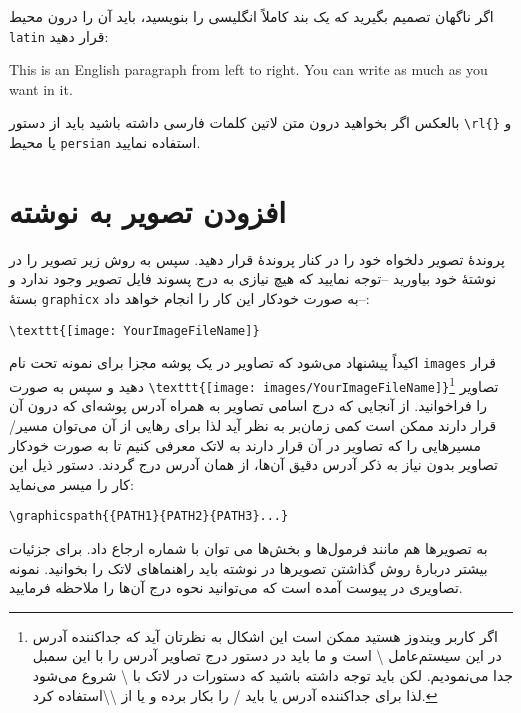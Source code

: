 اگر ناگهان تصمیم بگیرید که یک بند کاملاً انگلیسی را بنویسید، باید آن را درون محیط \Verb+latin+ قرار دهید:‌

\begin{latin}
This is an English paragraph from left to right. You can write as much as you want in it.
\end{latin}

    بالعکس اگر بخواهید درون متن لاتین کلمات فارسی داشته باشید باید از دستور \Verb+\rl{}+ و یا محیط \Verb+persian+ استفاده نمایید. 
    
\section{افزودن تصویر به نوشته}
پروندهٔ تصویر دلخواه خود را در کنار پروندهٔ  قرار دهید. سپس به روش زیر تصویر را در نوشتهٔ خود بیاورید --توجه نمایید که هیچ نیازی به درج پسوند 
فایل تصویر وجود ندارد و بستهٔ \Verb+graphicx+ به صورت خودکار این کار را انجام خواهد داد--:
\begin{Verbatim}
\texttt{[image: YourImageFileName]}
\end{Verbatim}
     اکیداً پیشنهاد می‌شود که تصاویر در یک پوشه مجزا برای نمونه تحت نام \Verb+images+ قرار دهید و سپس به صورت 
    \Verb+\texttt{[image: images/YourImageFileName]}+\footnote{
    اگر کاربر ویندوز هستید ممکن است این اشکال به نظرتان آید که جداکننده آدرس در این سیستم‌عامل \textbackslash{}     است و ما باید در دستور درج تصاویر 
    آدرس را با این سمبل جدا می‌نمودیم. لکن باید توجه داشته باشید که دستورات در لاتک با \textbackslash{}  شروع می‌شود لذا برای جداکننده 
    آدرس یا باید /  را بکار برده و یا از \textbackslash\textbackslash استفاده کرد.}
    تصاویر را فراخوانید. از آنجایی که درج اسامی تصاویر به همراه آدرس پوشه‌ای که درون آن قرار دارند ممکن است کمی زمان‌بر به نظر آید لذا برای رهایی از آن می‌توان 
    مسیر/مسیرهایی را که تصاویر در آن قرار دارند به لاتک معرفی کنیم تا به صورت خودکار تصاویر بدون نیاز به ذکر آدرس دقیق آن‌ها، از همان آدرس درج گردند. دستور ذیل 
    این کار را میسر می‌نماید:
\begin{Verbatim}
\graphicspath{{PATH1}{PATH2}{PATH3}...}
\end{Verbatim}    
    به تصویرها هم مانند فرمول‌ها و بخش‌ها می توان با شماره ارجاع داد. برای جزئیات بیشتر دربارهٔ روش گذاشتن تصویرها در نوشته باید راهنماهای لاتک 
    را بخوانید. نمونه تصاویری در پیوست آمده است که می‌توانید نحوه درج آن‌ها را ملاحظه فرمایید.


